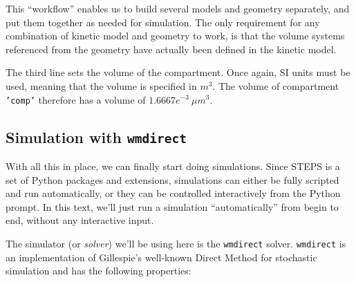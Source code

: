 \documentclass[a4paper,12pt]{book}
\begin{document}
This ``workflow'' enables us to build several models and geometry separately, and put them together as needed for simulation. The only requirement for any combination of kinetic model and geometry to work, is that the volume systems referenced from the geometry have actually been defined in the kinetic model.

The third line sets the volume of the compartment. Once again, SI units must be used, meaning that the volume is specified in $m^3$. The volume of compartment \texttt{'comp'} therefore has a volume of $1.6667e^{-3}\ \mu m^3$. 

\subsection{Simulation with \texttt{wmdirect}}

With all this in place, we can finally start doing simulations. Since STEPS is a set of Python packages and extensions, simulations can either be fully scripted and run automatically, or they can be controlled interactively from the Python prompt. In this text, we'll just run a simulation ``automatically'' from begin to end, without any interactive input. 

The simulator (or \emph{solver}) we'll be using here is the \texttt{wmdirect} solver. \texttt{wmdirect} is an implementation of Gillespie's well-known Direct Method for stochastic simulation and has the following properties:
\end{document}
